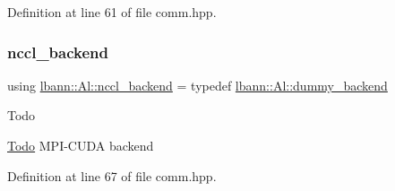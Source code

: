 Definition at line 61 of file comm.\+hpp.

\mbox{\label{namespacelbann_1_1Al_acac3d42323b313e89a60a27f00554661}} 
\subsubsection{\texorpdfstring{nccl\+\_\+backend}{nccl\_backend}}
{\footnotesize\ttfamily using \hyperlink{namespacelbann_1_1Al_acac3d42323b313e89a60a27f00554661}{lbann\+::\+Al\+::nccl\+\_\+backend} = typedef \hyperlink{classlbann_1_1Al_1_1dummy__backend}{lbann\+::\+Al\+::dummy\+\_\+backend}}

\begin{DoxyRefDesc}{Todo}
\item[\hyperlink{todo__todo000016}{Todo}]M\+P\+I-\/\+C\+U\+DA backend \end{DoxyRefDesc}


Definition at line 67 of file comm.\+hpp.

